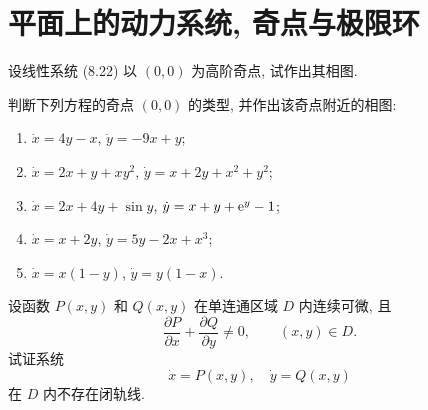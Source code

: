 \section{平面上的动力系统, 奇点与极限环}

\begin{exercise}
  设线性系统 (8.22) 以 $(0,0)$ 为高阶奇点, 试作出其相图.
\end{exercise}


\begin{exercise}
  判断下列方程的奇点 $(0,0)$ 的类型, 并作出该奇点附近的相图:
  \begin{enumerate}[(1)]
    \item $\dot{x} = 4y-x$, $\dot{y} = -9x+y$;
    \item $\dot{x} = 2x+y+xy^2$, $\dot{y} = x+2y+x^2+y^2$;
    \item $\dot{x} = 2x+4y+\sin y$, $\dot{y} = x+y+\mathrm{e}^y-1$;
    \item $\dot{x} = x+2y$, $\dot{y} = 5y-2x+x^3$;
    \item $\dot{x} = x(1-y)$, $\dot{y} = y(1-x)$.
  \end{enumerate}
\end{exercise}


\begin{exercise}
  设函数 $P(x,y)$ 和 $Q(x,y)$ 在单连通区域 $D$ 内连续可微, 且
  \[\frac{\partial P}{\partial x} + \frac{\partial Q}{\partial y} \neq 0,
    \qquad (x,y)\in D.\]
  试证系统
  \[\dot{x} = P(x,y),\quad \dot{y} = Q(x,y)\]
  在 $D$ 内不存在闭轨线.
\end{exercise}